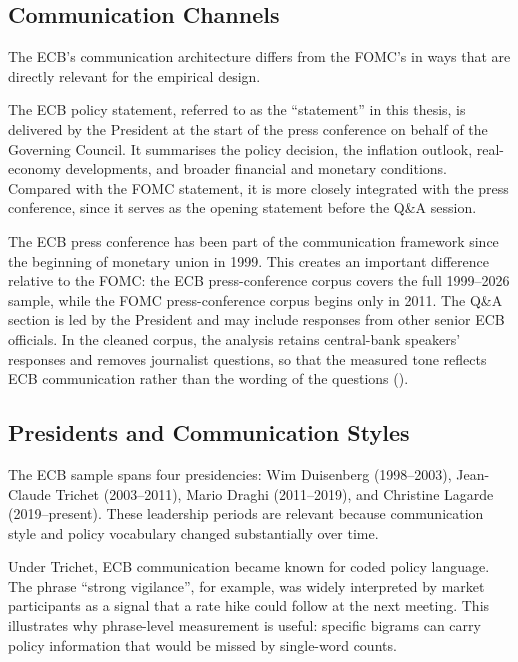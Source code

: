 \subsection{Communication Channels}
\label{sec:inst_ecb_channels}

The ECB's communication architecture differs from the FOMC's in ways
that are directly relevant for the empirical design.

The ECB policy statement, referred to as the ``statement'' in this
thesis, is delivered by the President at the start of the press
conference on behalf of the Governing Council. It summarises the policy
decision, the inflation outlook, real-economy developments, and broader
financial and monetary conditions. Compared with the FOMC statement, it
is more closely integrated with the press conference, since it serves as
the opening statement before the Q\&A session.

The ECB press conference has been part of the communication framework
since the beginning of monetary union in 1999. This creates an important
difference relative to the FOMC: the ECB press-conference corpus covers
the full 1999--2026 sample, while the FOMC press-conference corpus begins
only in 2011. The Q\&A section is led by the President and may include
responses from other senior ECB officials. In the cleaned corpus, the
analysis retains central-bank speakers' responses and removes journalist
questions, so that the measured tone reflects ECB communication rather
than the wording of the questions ().


\subsection{Presidents and Communication Styles}
\label{sec:inst_ecb_presidents}

The ECB sample spans four presidencies: Wim Duisenberg
(1998--2003), Jean-Claude Trichet (2003--2011), Mario Draghi
(2011--2019), and Christine Lagarde (2019--present). These leadership
periods are relevant because communication style and policy vocabulary
changed substantially over time.

Under Trichet, ECB communication became known for coded policy language.
The phrase ``strong vigilance'', for example, was widely interpreted by
market participants as a signal that a rate hike could follow at the next
meeting. This illustrates why phrase-level measurement is useful:
specific bigrams can carry policy information that would be missed by
single-word counts.


